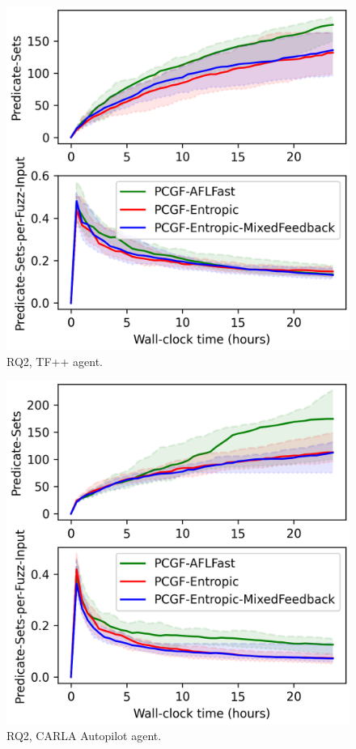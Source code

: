 \begin{figure}
    \centering
    \includegraphics[width=0.6\linewidth]{figures/chapter5/RQ2/(PCGF-AFLFast,PCGF-Entropic,PCGF-Entropic-MixedFeedback)_TFPP_all-coverage_(Predicate-Sets,Predicate-Sets-per-Fuzz-Input).png}
    \caption{RQ2, TF++ agent.}
    \label{fig:RQ2-TFPP}
\end{figure}


\begin{figure}
    \centering
    \includegraphics[width=0.6\linewidth]{figures/chapter5/RQ2/(PCGF-AFLFast,PCGF-Entropic,PCGF-Entropic-MixedFeedback)_autopilot_all-coverage_(Predicate-Sets,Predicate-Sets-per-Fuzz-Input).png}
    \caption{RQ2, CARLA Autopilot agent.}
    \label{fig:RQ2-autopilot}
\end{figure}



